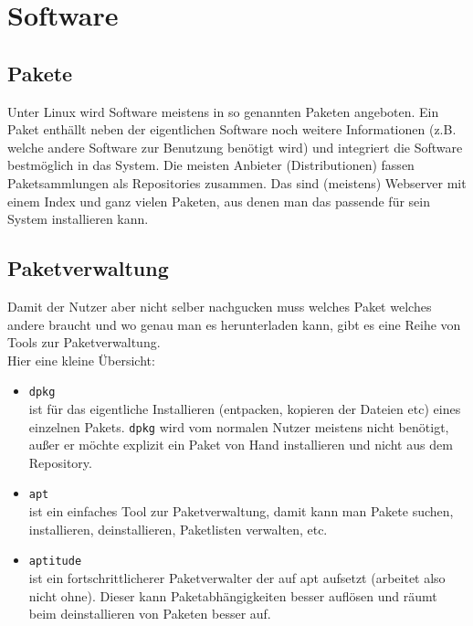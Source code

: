 \documentclass[a4paper,10pt]{article}
\begin{document}
  \section{Software}
    \subsection{Pakete}
      Unter Linux wird Software meistens in so genannten Paketen angeboten. Ein Paket enthällt neben der eigentlichen Software noch weitere Informationen (z.B. welche andere Software zur Benutzung benötigt wird) und integriert die Software bestmöglich in das System. Die meisten Anbieter (Distributionen) fassen Paketsammlungen als Repositories zusammen. Das sind (meistens) Webserver mit einem Index und ganz vielen Paketen, aus denen man das passende für sein System installieren kann.

    \subsection{Paketverwaltung}
      Damit der Nutzer aber nicht selber nachgucken muss welches Paket welches andere braucht und wo genau man es herunterladen kann, gibt es eine Reihe von Tools zur Paketverwaltung.\\
      Hier eine kleine Übersicht:
      \begin{itemize}
	\item \texttt{dpkg} \\
	  ist für das eigentliche Installieren (entpacken, kopieren der Dateien etc) eines einzelnen Pakets. \texttt{dpkg} wird vom normalen Nutzer meistens nicht benötigt, außer er möchte explizit ein Paket von Hand installieren und nicht aus dem Repository.
	\item \texttt{apt} \\ 
	  ist ein einfaches Tool zur Paketverwaltung, damit kann man Pakete suchen, installieren, deinstallieren, Paketlisten verwalten, etc.
	\item \texttt{aptitude} \\ 
	  ist ein fortschrittlicherer Paketverwalter der auf apt aufsetzt (arbeitet also nicht ohne). Dieser kann Paketabhängigkeiten besser auflösen und räumt beim deinstallieren von Paketen besser auf.
      \end{itemize}
\end{document}
